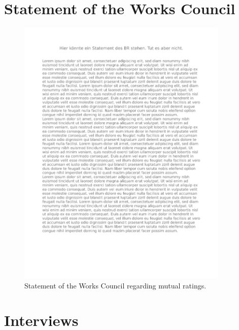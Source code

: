 \cleardoublepage

\begin{appendices}

\chapter{Statement of the Works Council}
\label{statement_br}
\begin{figure}[!h]
    \centering
    \includegraphics[width=0.9\textwidth,page=1]{images/statement_br.pdf}
    \caption[Statement of the Works Council]{Statement of the Works Council regarding mutual ratings.}
\end{figure}

\chapter{Interviews}


\end{appendices}
